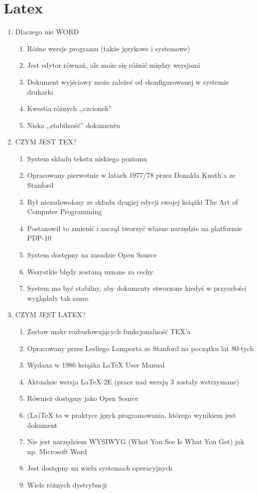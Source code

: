 \documentclass[a4paper,twoside,onecolumn]{report}
\begin{document}
	\section{Latex}
		\begin{enumerate}
			\item Dlaczego nie WORD
			\begin{enumerate}
				\item Różne wersje programu (także językowe i systemowe)
				\item Jest edytor równań, ale może się różnić między wersjami
				\item Dokument wyjściowy może zależeć od skonfigurowanej w systemie drukarki
				\item Kwestia różnych ,,czcionek''
				\item Niska ,,stabilność'' dokumentu
			\end{enumerate}

			\item CZYM JEST TEX?
			\begin{enumerate}
				\item System składu tekstu niskiego poziomu
				\item Opracowany pierwotnie w latach 1977/78 przez Donalda Knuth’a ze Stanford
				\item Był niezadowolony ze składu drugiej edycji swojej książki The Art of Computer Programming
				\item Postanowił to zmienić i zaczął tworzyć własne narzędzie na platformie PDP-10
				\item System dostępny na zasadzie Open Source
				\item Wszystkie błędy zostaną uznane za cechy
				\item System ma być stabilny, aby dokumenty stworzone kiedyś w przyszłości wyglądały tak samo
			\end{enumerate}

			\item CZYM JEST LATEX?
			\begin{enumerate}
				\item Zestaw makr rozbudowujących funkcjonalność TEX’a
				\item Opracowany przez Lesliego Lamporta ze Stanford na początku lat 80-tych
				\item Wydana w 1986 książka LaTeX User Manual
				\item Aktualnie wersja LaTeX 2E (prace nad wersją 3 zostały wstrzymane)
				\item Również dostępny jako Open Source
				\item (La)TeX to w praktyce język programowania, którego wynikiem jest dokument
				\item Nie jest narzędziem WYSIWYG (What You See Is What You Get) jak np. Microsoft Word
				\item Jest dostępny na wielu systemach operacyjnych
				\item Wiele różnych dystrybucji
			\end{enumerate}


\end{enumerate}
\end{document}
